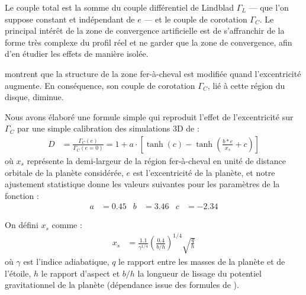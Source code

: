 Le couple total est la somme du couple différentiel de Lindblad $\Gamma_L$ --- que l'on suppose constant et indépendant de $e$ --- et le couple de corotation $\Gamma_C$. Le principal intérêt de la zone de convergence artificielle est de s'affranchir de la forme très complexe du profil réel et ne garder que la zone de convergence, afin d'en étudier les effets de manière isolée.

\bigskip

\cite{bitsch2010orbital} montrent que la structure de la zone fer-à-cheval est modifiée quand l'excentricité augmente. En conséquence, son couple de corotation $\Gamma_C$, lié à cette région du disque, diminue. 

Nous avons élaboré une formule simple qui reproduit l'effet de l'excentricité sur $\Gamma_C$ par une simple calibration des simulations 3D de \cite{bitsch2010orbital} : 
\begin{align}
D &= \frac{\Gamma_C(e)}{\Gamma_C (e=0)} = 1 + a \cdot \left[\tanh(c) - \tanh\left(\frac{b * e}{x_s}+c\right)\right]\label{eq:shifted-eccentricity-influence}
\end{align}
où $x_s$ représente la demi-largeur de la région fer-à-cheval en unité de distance orbitale de la planète considérée, $e$ est l'excentricité de la planète, et notre ajustement statistique donne les valeurs suivantes pour les paramètres de la fonction :
\begin{align}
a &= 0.45 & b &= 3.46 & c &= -2.34
\end{align}

On défini $x_s$ comme \citep[eq. (44)]{paardekooper2010torque} :
\begin{align}
x_s &= \frac{1.1}{\gamma^{1/4}} \left(\frac{0.4}{b/h}\right)^{1/4} \sqrt{\frac{q}{h}}
\end{align}
où $\gamma$ est l'indice adiabatique, $q$ le rapport entre les masses de la planète et de l'étoile, $h$ le rapport d'aspect et $b/h$ la longueur de lissage du potentiel gravitationnel de la planète (dépendance issue des formules de \cite{paardekooper2011torque}).

